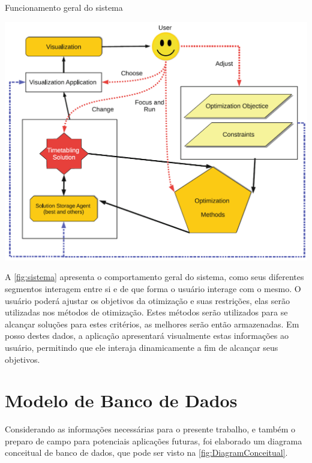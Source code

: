 \begin{CenteredFigure}
  \caption{Funcionamento geral do sistema}
  \label{fig:sistema}
  \includegraphics[width=\textwidth]{files/img/Arquitetura/Arquitetura_bebis_information_2019}
\end{CenteredFigure}

A \autoref{fig:sistema} apresenta o comportamento geral do sistema, como seus diferentes segmentos interagem entre si e de que forma o usuário interage com o mesmo. O usuário poderá ajustar os objetivos da otimização e suas restrições, elas serão utilizadas nos métodos de otimização. Estes métodos serão utilizados para se alcançar soluções para estes critérios, as melhores serão então armazenadas. Em posso destes dados, a aplicação apresentará visualmente estas informações ao usuário, permitindo que ele interaja dinamicamente a fim de alcançar seus objetivos.

\section{Modelo de Banco de Dados} \label{sec:ModelagemBD} %

Considerando as informações necessárias para o presente trabalho, e também o preparo de campo para potenciais aplicações futuras, foi elaborado um diagrama conceitual de banco de dados, que pode ser visto na \autoref{fig:DiagramConceitual}.

